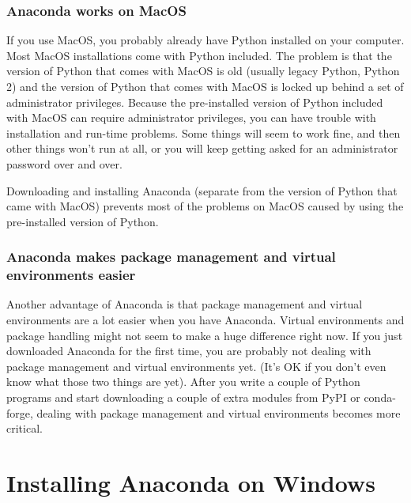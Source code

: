 \documentclass{book}
\begin{document}
\hypertarget{anaconda-works-on-macos}{%
\subsubsection{Anaconda works on MacOS}\label{anaconda-works-on-macos}}

If you use MacOS, you probably already have Python installed on your
computer. Most MacOS installations come with Python included. The
problem is that the version of Python that comes with MacOS is old
(usually legacy Python, Python 2) and the version of Python that comes
with MacOS is locked up behind a set of administrator privileges.
Because the pre-installed version of Python included with MacOS can
require administrator privileges, you can have trouble with installation
and run-time problems. Some things will seem to work fine, and then
other things won't run at all, or you will keep getting asked for an
administrator password over and over.

Downloading and installing Anaconda (separate from the version of Python
that came with MacOS) prevents most of the problems on MacOS caused by
using the pre-installed version of Python.

\hypertarget{anaconda-makes-package-management-and-virtual-environments-easier}{%
\subsubsection{Anaconda makes package management and virtual
environments
easier}\label{anaconda-makes-package-management-and-virtual-environments-easier}}

Another advantage of Anaconda is that package management and virtual
environments are a lot easier when you have Anaconda. Virtual
environments and package handling might not seem to make a huge
difference right now. If you just downloaded Anaconda for the first
time, you are probably not dealing with package management and virtual
environments yet. (It's OK if you don't even know what those two things
are yet). After you write a couple of Python programs and start
downloading a couple of extra modules from PyPI or conda-forge, dealing
with package management and virtual environments becomes more critical.
    




    
        \hypertarget{installing-anaconda-on-windows}{%
\section{Installing Anaconda on
Windows}\label{installing-anaconda-on-windows}}
    
\end{document}
